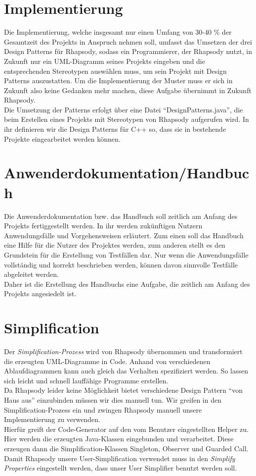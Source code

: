 \section{Implementierung}

Die Implementierung, welche insgesamt nur einen Umfang von 30-40 \% der Gesamtzeit des Projekts in Anspruch nehmen soll, umfasst das Umsetzen der drei Design Patterns für Rhapsody, sodass ein Programmierer, der Rhapsody nutzt, in Zukunft nur ein UML-Diagramm seines Projekts eingeben und die entsprechenden Stereotypen auswählen muss, um sein Projekt mit Design Patterns auszustatten. Um die Implementierung der Muster muss er sich in Zukunft also keine Gedanken mehr machen, diese Aufgabe übernimmt in Zukunft Rhapsody.\\
Die Umsetzung der Patterns erfolgt über eine Datei “DesignPatterns.java”, die beim Erstellen eines Projekts mit Stereotypen von Rhapsody aufgerufen wird. In ihr definieren wir die Design Patterns für C++ so, dass sie in bestehende Projekte eingearbeitet werden können.

\section{Anwenderdokumentation/Handbuch}

Die Anwenderdokumentation bzw. das Handbuch soll zeitlich am Anfang des Projekts fertiggestellt werden. In ihr werden zukünftigen Nutzern Anwendungsfälle und Vorgehensweisen erläutert. Zum einen soll das Handbuch eine Hilfe für die Nutzer des Projektes werden, zum anderen stellt es den Grundstein für die Erstellung von Testfällen dar. Nur wenn die Anwendungsfälle vollständig und korrekt beschrieben werden, können davon sinnvolle Testfälle abgeleitet werden.\\
Daher ist die Erstellung des Handbuchs eine Aufgabe, die zeitlich am Anfang des Projekts angesiedelt ist.

\section{Simplification}
Der \textit{Simplification-Prozess} wird von Rhapsody übernommen und transformiert die
erzeugten UML-Diagramme in Code. Anhand von verschiedenen Ablaufdiagrammen kann
auch gleich das Verhalten spezifiziert werden. So lassen sich leicht und schnell
lauffähige Programme erstellen.\\
\newline
Da Rhapsody leider keine Möglichkeit bietet verschiedene Design Pattern \enquote{von Haus
aus} einzubinden müssen wir dies manuell tun. Wir greifen in den
Simplification-Prozess ein und zwingen Rhapsody manuell unsere Implementierung
zu verwenden.\\
Hierfür greift der Code-Generator auf den vom Benutzer eingestellten Helper zu.
Hier werden die erzeugten Java-Klassen eingebunden und verarbeitet. Diese
erzeugen dann die Simplification-Klassen Singleton, Observer und Guarded Call.
Damit Rhapsody unsere User-Simplification verwendet muss in den \textit{Simplify
Properties} eingestellt werden, dass unser User Simplifier benutzt werden soll.
\cite{oldDoku}

